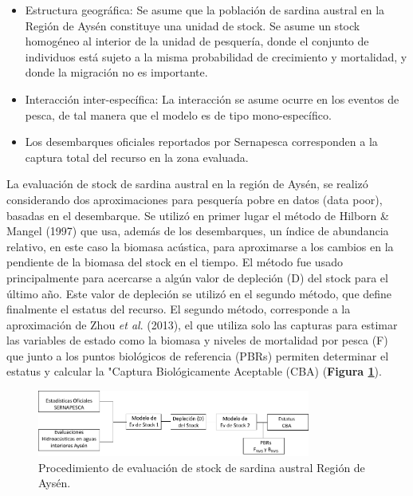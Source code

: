 \documentclass[
  spanish,
]{article}
\begin{document}
\begin{itemize}
\item
  Estructura geográfica: Se asume que la población de sardina austral en
  la Región de Aysén constituye una unidad de stock. Se asume un stock
  homogéneo al interior de la unidad de pesquería, donde el conjunto de
  individuos está sujeto a la misma probabilidad de crecimiento y
  mortalidad, y donde la migración no es importante.
\item
  Interacción inter-específica: La interacción se asume ocurre en los
  eventos de pesca, de tal manera que el modelo es de tipo
  mono-específico.
\item
  Los desembarques oficiales reportados por Sernapesca corresponden a la
  captura total del recurso en la zona evaluada.
\end{itemize}

La evaluación de stock de sardina austral en la región de Aysén, se
realizó considerando dos aproximaciones para pesquería pobre en datos
(data poor), basadas en el desembarque. Se utilizó en primer lugar el
método de Hilborn \& Mangel (1997) que usa, además de los desembarques,
un índice de abundancia relativo, en este caso la biomasa acústica, para
aproximarse a los cambios en la pendiente de la biomasa del stock en el
tiempo. El método fue usado principalmente para acercarse a algún valor
de depleción (D) del stock para el último año. Este valor de depleción
se utilizó en el segundo método, que define finalmente el estatus del
recurso. El segundo método, corresponde a la aproximación de Zhou
\emph{et al}. (2013), el que utiliza solo las capturas para estimar las
variables de estado como la biomasa y niveles de mortalidad por pesca
(F) que junto a los puntos biológicos de referencia (PBRs) permiten
determinar el estatus y calcular la "Captura Biológicamente Aceptable
(CBA) (\textbf{Figura \ref{Fig5}}). \vspace{0.5cm}

\begin{figure}[htb!]
\centering
\includegraphics[width=0.8\textwidth]{Figuras/Fig3_ProcEval.pdf}
\caption{Procedimiento de evaluación de stock de sardina austral Región de Aysén.}
\label{Fig5}
\end{figure}
\end{document}
